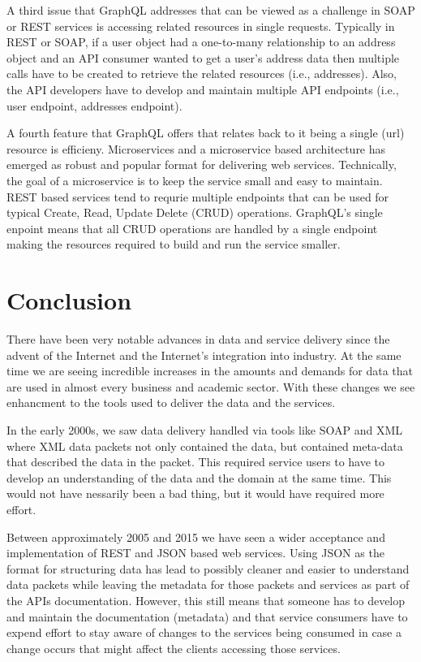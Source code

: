 A third issue that GraphQL addresses that can be viewed as a challenge in SOAP 
or REST services is accessing related resources in single requests\cite{FacebookGraphQL2018}.  
Typically in REST or SOAP, if a user object had a one-to-many relationship to 
an address object and an API consumer wanted to get a user's address data then 
multiple calls have to be created to retrieve the related resources 
(i.e., addresses).  Also, the API developers have to develop and maintain 
multiple API endpoints (i.e., user endpoint, addresses endpoint).

A fourth feature that GraphQL offers that relates back to it being a single 
(url) resource is efficieny.  Microservices and a microservice based 
architecture has emerged as robust and popular format for delivering web 
services.  Technically, the goal of a microservice is to keep the service small 
and easy to maintain. REST based services tend to requrie multiple endpoints 
that can be used for typical Create, Read, Update Delete (CRUD) operations.  
GraphQL's single enpoint means that all CRUD operations are handled by a single 
endpoint making the resources required to build and run the service smaller.

\section{Conclusion}
There have been very notable advances in data and service delivery since the 
advent of the Internet and the Internet's integration into industry.  At the 
same time we are seeing incredible increases in the amounts and demands for 
data that are used in almost every business and academic sector.  With these 
changes we see enhancment to the tools used to deliver the data and the 
services.  

In the early 2000s, we saw data delivery handled via tools like SOAP and XML 
where XML data packets not only contained the data, but contained meta-data 
that described the data in the packet.  This required service users to have to 
develop an understanding of the data and the domain at the same time.  This 
would not have nessarily been a bad thing, but it would have required more 
effort.

Between approximately 2005 and 2015 we have seen a wider acceptance and 
implementation of REST and JSON based web services.  Using JSON as the format 
for structuring data has lead to possibly cleaner and easier to understand 
data packets while leaving the metadata for those packets and services as part 
of the APIs documentation.  However, this still means that someone has to 
develop and maintain the documentation (metadata) and that service consumers 
have to expend effort to stay aware of changes to the services being consumed 
in case a change occurs that might affect the clients accessing those services.

